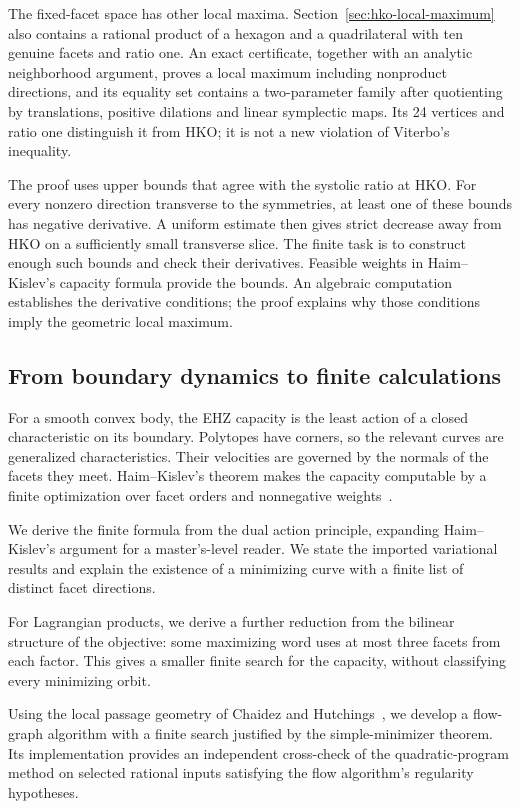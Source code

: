 The fixed-facet space has other local maxima. Section~\ref{sec:hko-local-maximum}
also contains a rational product of a hexagon and a quadrilateral with ten
genuine facets and ratio one. An exact certificate, together with an analytic
neighborhood argument, proves a local maximum including nonproduct directions,
and its equality set contains a
two-parameter family after quotienting by translations, positive dilations and
linear symplectic maps. Its 24 vertices and ratio one distinguish it from HKO;
it is not a new violation of Viterbo's inequality.

The proof uses upper bounds that agree with the systolic ratio at HKO.
For every nonzero direction transverse to the symmetries, at least one of
these bounds has negative derivative. A uniform estimate then gives strict
decrease away from HKO on a sufficiently small transverse slice.
The finite task is to construct enough
such bounds and check their derivatives. Feasible weights in Haim--Kislev's
capacity formula provide the bounds. An algebraic computation establishes the derivative
conditions; the proof explains why those conditions imply the geometric
local maximum.

\subsection{From boundary dynamics to finite calculations}

For a smooth convex body, the EHZ capacity is the least action of a closed
characteristic on its boundary. Polytopes have corners, so the relevant
curves are generalized characteristics. Their velocities are governed by
the normals of the facets they meet. Haim--Kislev's theorem makes the
capacity computable by a finite optimization over facet orders and
nonnegative weights~\cite{HK2017}.

We derive the finite formula from the dual action principle, expanding
Haim--Kislev's argument for a master's-level reader. We state the imported
variational results and explain the existence of a minimizing curve with a
finite list of distinct facet directions.

For Lagrangian products, we derive a further reduction from the bilinear
structure of the objective: some maximizing word uses at most three facets
from each factor. This gives a smaller finite search for the capacity,
without classifying every minimizing orbit.

Using the local passage geometry of Chaidez and Hutchings~\cite{CH2021},
we develop a flow-graph algorithm with a finite search justified by the
simple-minimizer theorem. Its implementation provides an independent
cross-check of the quadratic-program method on selected rational inputs
satisfying the flow algorithm's regularity hypotheses.

